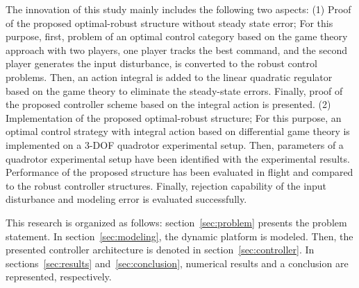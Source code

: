 \documentclass[3p]{elsarticle}
\begin{document}
The innovation of this study mainly includes the following two aspects: (1) Proof of the proposed optimal-robust structure without steady state error; For this purpose, first, problem of an optimal control category based on the game theory approach with two players, one player tracks the best command, and the second player generates the input disturbance, is converted to the robust control problems. Then, an action integral is added to the linear quadratic regulator based on the game theory to eliminate the steady-state errors. Finally, proof of the proposed controller scheme based on the integral action is presented. (2) Implementation of the proposed optimal-robust structure; For this purpose, an optimal control strategy with integral action based on differential game theory is implemented on a 3-DOF quadrotor experimental setup. Then, parameters of a quadrotor experimental setup have been identified with the experimental results. Performance of the proposed structure has been evaluated in flight and compared to the robust controller structures. Finally, rejection capability of the input disturbance and modeling error is evaluated successfully.


This research is organized as follows: section~\ref{sec:problem} presents the problem statement.
In section~\ref{sec:modeling}, the dynamic platform is modeled. Then, the presented controller architecture is denoted in section~\ref{sec:controller}. 
In sections~\ref{sec:results} and~\ref{sec:conclusion}, numerical results and a conclusion are represented, respectively.
\end{document}
